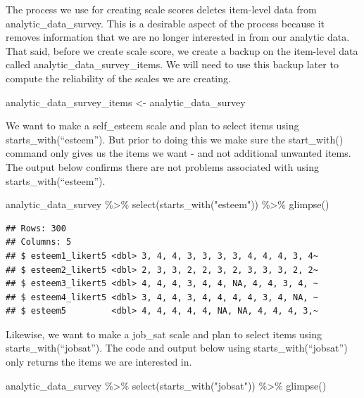\documentclass[
]{krantz}
\makeatletter
\newenvironment{Shaded}{\begin{snugshade}}{\end{snugshade}}
\newcommand{\FunctionTok}[1]{\textcolor[rgb]{0,0,0}{#1}}
\newcommand{\NormalTok}[1]{#1}
\newcommand{\OtherTok}[1]{\textcolor[rgb]{0.37,0.37,0.37}{#1}}
\newcommand{\SpecialCharTok}[1]{\textcolor[rgb]{0,0,0}{#1}}
\newcommand{\StringTok}[1]{\textcolor[rgb]{0.5,0.5,0.5}{#1}}
\newenvironment{kframe}{%
\medskip{}
\setlength{\fboxsep}{.8em}
 \def\at@end@of@kframe{}%
 \ifinner\ifhmode%
  \def\at@end@of@kframe{\end{minipage}}%
  \begin{minipage}{\columnwidth}%
 \fi\fi%
 \def\FrameCommand##1{\hskip\@totalleftmargin \hskip-\fboxsep
 \colorbox{shadecolor}{##1}\hskip-\fboxsep
     \hskip-\linewidth \hskip-\@totalleftmargin \hskip\columnwidth}%
 \MakeFramed {\advance\hsize-\width
   \@totalleftmargin\z@ \linewidth\hsize
   \@setminipage}}%
 {\par\unskip\endMakeFramed%
 \at@end@of@kframe}
\renewenvironment{Shaded}{\begin{kframe}}{\end{kframe}}
\makeatother
\begin{document}
The process we use for creating scale scores deletes item-level data from analytic\_data\_survey. This is a desirable aspect of the process because it removes information that we are no longer interested in from our analytic data. That said, before we create scale score, we create a backup on the item-level data called analytic\_data\_survey\_items. We will need to use this backup later to compute the reliability of the scales we are creating.

\begin{Shaded}
\begin{Highlighting}[]
\NormalTok{analytic\_data\_survey\_items }\OtherTok{\textless{}{-}}\NormalTok{ analytic\_data\_survey}
\end{Highlighting}
\end{Shaded}

We want to make a self\_esteem scale and plan to select items using starts\_with(``esteem''). But prior to doing this we make sure the start\_with() command only gives us the items we want - and not additional unwanted items. The output below confirms there are not problems associated with using starts\_with(``esteem'').

\begin{Shaded}
\begin{Highlighting}[]
\NormalTok{analytic\_data\_survey }\SpecialCharTok{\%\textgreater{}\%}
  \FunctionTok{select}\NormalTok{(}\FunctionTok{starts\_with}\NormalTok{(}\StringTok{"esteem"}\NormalTok{)) }\SpecialCharTok{\%\textgreater{}\%}
  \FunctionTok{glimpse}\NormalTok{()}
\end{Highlighting}
\end{Shaded}

\begin{verbatim}
## Rows: 300
## Columns: 5
## $ esteem1_likert5 <dbl> 3, 4, 4, 3, 3, 3, 3, 4, 4, 4, 3, 4~
## $ esteem2_likert5 <dbl> 2, 3, 3, 2, 2, 3, 2, 3, 3, 3, 2, 2~
## $ esteem3_likert5 <dbl> 4, 4, 4, 3, 4, 4, NA, 4, 4, 3, 4, ~
## $ esteem4_likert5 <dbl> 3, 4, 4, 3, 4, 4, 4, 4, 3, 4, NA, ~
## $ esteem5         <dbl> 4, 4, 4, 4, 4, NA, NA, 4, 4, 4, 3,~
\end{verbatim}

Likewise, we want to make a job\_sat scale and plan to select items using starts\_with(``jobsat''). The code and output below using starts\_with(``jobsat'') only returns the items we are interested in.

\begin{Shaded}
\begin{Highlighting}[]
\NormalTok{analytic\_data\_survey }\SpecialCharTok{\%\textgreater{}\%}
  \FunctionTok{select}\NormalTok{(}\FunctionTok{starts\_with}\NormalTok{(}\StringTok{"jobsat"}\NormalTok{)) }\SpecialCharTok{\%\textgreater{}\%}
  \FunctionTok{glimpse}\NormalTok{()}
\end{Highlighting}
\end{Shaded}
\end{document}
